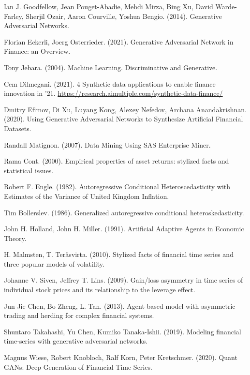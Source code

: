 \documentclass[runningheads]{llncs}
\begin{document}
\begin{thebibliography}{8}
Ian J. Goodfellow, Jean Pouget-Abadie, Mehdi Mirza, Bing Xu, David Warde-Farley, Sherjil Ozair, Aaron Courville, Yoshua Bengio. (2014). Generative Adversarial Networks.

Florian Eckerli, Joerg Osterrieder. (2021). Generative Adversarial Network in Finance: an Overview.

Tony Jebara. (2004). Machine Learning. Discriminative and Generative.

Cem Dilmegani. (2021). 4 Synthetic data applications to enable finance innovation in ’21.
\url{https://research.aimultiple.com/synthetic-data-finance/}

Dmitry Efimov, Di Xu, Luyang Kong, Alexey Nefedov, Archana Anandakrishnan. (2020). Using Generative Adversarial Networks to Synthesize Artificial Financial Datasets.

Randall Matignon. (2007). Data Mining Using SAS Enterprise Miner.

Rama Cont. (2000). Empirical properties of asset returns: stylized facts and statistical issues.

Robert F. Engle. (1982). Autoregressive Conditional Heteroscedasticity with Estimates of the Variance of United Kingdom Inflation.

Tim Bollerslev. (1986). Generalized autoregressive conditional heteroskedasticity.

John H. Holland, John H. Miller. (1991). Artificial Adaptive Agents in Economic Theory.

H. Malmsten, T. Teräsvirta. (2010). Stylized facts of ﬁnancial time series and three popular models of volatility.

Johanne V. Siven, Jeffrey T. Lins. (2009). Gain/loss asymmetry in time series of individual stock prices and its relationship to the leverage eﬀect.

Jun-Jie Chen, Bo Zheng, L. Tan. (2013). Agent-based model with asymmetric trading and herding for complex ﬁnancial systems.

Shuntaro Takahashi, Yu Chen, Kumiko Tanaka-Ishii. (2019). Modeling ﬁnancial time-series with generative adversarial networks.

Magnus Wiese, Robert Knobloch, Ralf Korn, Peter Kretschmer. (2020). Quant GANs: Deep Generation of Financial Time Series.


\end{thebibliography}
\end{document}
